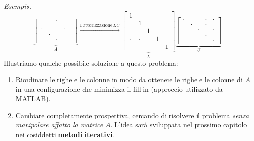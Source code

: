 \textit{Esempio.}
\begin{equation*}
	\underbrace{
		\begin{bmatrix}
				  &       & \cdot &       &   \\
				  &       &       &       &   \\
			\cdot &       &       & \cdot &   \\
				  & \cdot &       &       &   \\
				  &       & \cdot &       &
		\end{bmatrix}
		}_{A}\xrightarrow{\text{Fattorizzazione} \ LU}\underbrace{
		\begin{bmatrix}
			1     &       &       &   &   \\
			      & 1     &       &   &   \\
			      &       & 1     &   &   \\
			\cdot & \cdot &       & 1 &   \\
			\cdot &       & \cdot &   & 1
		\end{bmatrix}
		}_{L}\underbrace{
		\begin{bmatrix}
			\cdot &       &       & \cdot & \cdot \\
			      & \cdot &       & \cdot &       \\
			      &       & \cdot &       & \cdot \\
			      &       &       & \cdot &       \\
			      &       &       &       & \cdot
		\end{bmatrix}
	}_{U}
\end{equation*}
Illustriamo qualche possibile soluzione a questo problema:
\begin{enumerate}
\item Riordinare le righe e le colonne in modo da ottenere le righe e le colonne di $A$ in una configurazione che minimizza il fill-in (approccio utilizzato da MATLAB).
\item Cambiare completamente prospettiva, cercando di risolvere il problema \textit{senza manipolare affatto la matrice }$A$. L'idea sarà sviluppata nel prossimo capitolo nei cosiddetti \textbf{metodi iterativi}.
\end{enumerate}
